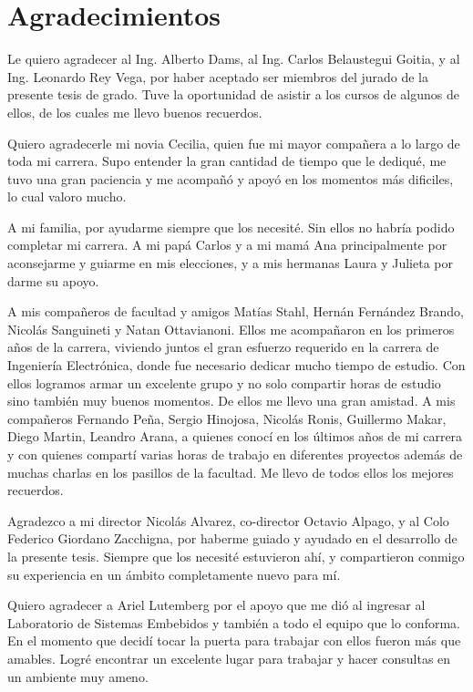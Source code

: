 \thispagestyle{empty}
\chapter*{Agradecimientos}

Le quiero agradecer al Ing. Alberto Dams, al Ing. Carlos Belaustegui Goitia, y al Ing. Leonardo Rey Vega, por haber aceptado ser miembros del jurado de la presente tesis de grado. Tuve la oportunidad de asistir a los cursos de algunos de ellos, de los cuales me llevo buenos recuerdos.

Quiero agradecerle mi novia Cecilia, quien fue mi mayor compañera a lo largo de toda mi carrera. Supo entender la gran cantidad de tiempo que le dediqué, me tuvo una gran paciencia y me acompañó y apoyó en los momentos más dificiles, lo cual valoro mucho.

A mi familia, por ayudarme siempre que los necesité. Sin ellos no habría podido completar mi carrera. A mi papá Carlos y a mi mamá Ana principalmente por aconsejarme y guiarme en mis elecciones, y a mis hermanas Laura y Julieta por darme su apoyo.

A mis compañeros de facultad y amigos Matías Stahl, Hernán Fernández Brando, Nicolás Sanguineti y Natan Ottavianoni. Ellos me acompañaron en los primeros años de la carrera, viviendo juntos el gran esfuerzo requerido en la carrera de Ingeniería Electrónica, donde fue necesario dedicar mucho tiempo de estudio. Con ellos logramos armar un excelente grupo y no solo compartir horas de estudio sino también muy buenos momentos. De ellos me llevo una gran amistad. A mis compañeros Fernando Peña, Sergio Hinojosa, Nicolás Ronis, Guillermo Makar, Diego Martin, Leandro Arana, a quienes conocí en los últimos años de mi carrera y con quienes compartí varias horas de trabajo en diferentes proyectos además de muchas charlas en los pasillos de la facultad. Me llevo de todos ellos los mejores recuerdos.

Agradezco a mi director Nicolás Alvarez, co-director Octavio Alpago, y al Colo Federico Giordano Zacchigna, por haberme guiado y ayudado en el desarrollo de la presente tesis. Siempre que los necesité estuvieron ahí, y compartieron conmigo su experiencia en un ámbito completamente nuevo para mí.

Quiero agradecer a Ariel Lutemberg por el apoyo que me dió al ingresar al Laboratorio de Sistemas Embebidos y también a todo el equipo que lo conforma. En el momento que decidí tocar la puerta para trabajar con ellos fueron más que amables. Logré encontrar un excelente lugar para trabajar y hacer consultas en un ambiente muy ameno.

